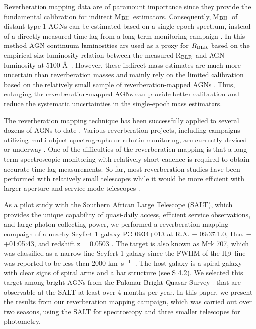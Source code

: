 \documentclass[iop]{emulateapj}
\newcommand{\Hb}{\rm H{$\beta$}}
\newcommand{\mbh}{M$_{\rm BH}$}
\newcommand{\kms}{km~s$^{\rm -1}$}
\begin{document}
Reverberation mapping data are of paramount importance since they provide the fundamental calibration for indirect \mbh\
estimators. Consequently, \mbh\ of distant type 1 AGNs can be estimated based on a single-epoch spectrum, 
instead of a directly measured time lag from a long-term monitoring campaign \citep{Kaspi+00, Vestergaard2006, McGill+08, Woo2015, Park+17}. 
In this method AGN continuum luminosities are used as a proxy for $R_{\rm BLR}$ based on the empirical size-luminosity relation between the measured R$_{\rm BLR}$ and AGN luminosity at 5100 \AA\ \citep[e.g.,][]{Bentz2013}.  
However, these indirect mass estimates are much more uncertain than reverberation masses
\citep[a factor of 2-3 in the case of \Hb-based mass estimates;][]{Woo2010, Park2012} and mainly rely on the limited calibration based on 
the relatively small sample of reverberation-mapped AGNs \citep[e.g.,][]{Woo+13,Grier2013,Woo2015}. 
Thus, enlarging the reverberation-mapped AGNs can provide better calibration and reduce the systematic uncertainties in
the single-epoch mass estimators. 

The reverberation mapping technique has been successfully applied to several dozens of AGNs to date 
\citep[e.g.,][]{Wandel1999, Kaspi+00,Peterson2004,Bentz2009b,Barth2011,Grier2013, Barth2015,Fausnaugh+17}. 
Various reverberation projects, including campaigns utilizing multi-object spectrographs or robotic monitoring,
are currently devised or underway \citep[e.g.][]{Valenti2015, Shen2016}.
One of the difficulties of the reverberation mapping is that a long-term spectroscopic
monitoring with relatively short cadence is required to obtain accurate time
lag measurements. So far, most reverberation studies have been performed with relatively small
telescopes while it would be more efficient with larger-aperture and
service mode telescopes \citep[e.g., see a recent reverberation study with
the HET by][]{Rafter2011}.

As a pilot study with the Southern African Large Telescope (SALT), which provides
the unique capability of quasi-daily access, efficient service observations, and large photon-collecting power,
we performed a reverberation mapping campaign of a nearby Seyfert 1 galaxy PG 0934+013 
at R.A. = 09:37:1.0, Dec. = $+$01:05:43, and redshift z = 0.0503 \citep{Veroncetty2001}.
The target is also known as Mrk 707, which was classified as a narrow-line Seyfert 1 galaxy since the FWHM of the \Hb\ line
was reported to be less than 2000 \kms\ \citep[e.g., 1320 \kms\ by][]{BG92}. The host galaxy is a spiral galaxy with clear signs of spiral arms and  a bar structure
(see S 4.2). We selected this target among bright AGNs
from the Palomar Bright Quasar Survey \citep{Schmidt&Green83}, that are observable at the SALT at least over 4 months per year.
In this paper, we present the results from our reverberation mapping campaign, which was carried out over two seasons, using the SALT for spectroscopy and three smaller telescopes for photometry. 
\end{document}
